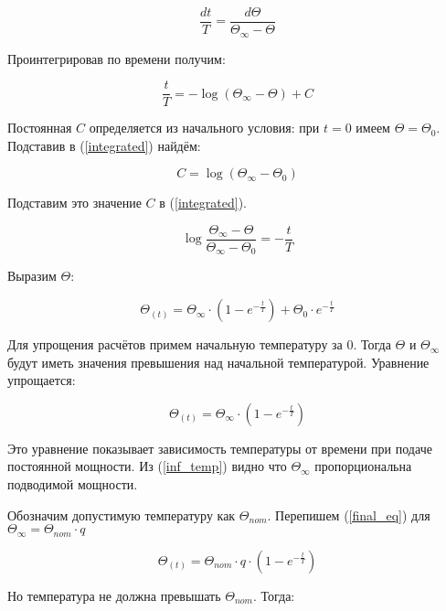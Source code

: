 \documentclass[a4paper]{article}
\begin{document}
\begin{equation}
\label{new_heating}
\frac{dt}{T}=\frac{d\Theta}{\Theta_{\infty}-\Theta}
\end{equation}

Проинтегрировав по времени получим:

\begin{equation}
\label{integrated}
\frac{t}{T}=-\log{(\Theta_{\infty}-\Theta)}+C
\end{equation}

Постоянная $C$ определяется из начального условия: при $t=0$ имеем
$\Theta=\Theta_{0}$. Подставив в (\ref{integrated}) найдём:

\begin{equation}
    C=\log{(\Theta_{\infty}-\Theta_{0})}
\end{equation}

Подставим это значение $C$ в (\ref{integrated}).

\begin{equation}
\log{\frac{\Theta_{\infty}-\Theta}{\Theta_{\infty}-\Theta_{0}}}=-\frac{t}{T}
\end{equation}

Выразим $\Theta$:

\begin{equation}
    \Theta_{(t)} = \Theta_{\infty}{\cdot}(1-e^{-\frac{t}{T}}) +
         {\Theta}_{0}{\cdot}e^{-\frac{t}{T}}
\end{equation}

Для упрощения расчётов примем начальную температуру за $0$. Тогда $\Theta$
и $\Theta_\infty$ будут иметь значения превышения над начальной температурой.
Уравнение упрощается:

\begin{equation}
\label{final_eq}
\Theta_{(t)} = \Theta_{\infty}{\cdot}(1-e^{-\frac{t}{T}})
\end{equation}

Это уравнение показывает зависимость температуры от времени при подаче постоянной
мощности. Из (\ref{inf_temp}) видно что $\Theta_{\infty}$ пропорциональна подводимой
мощности.

Обозначим допустимую температуру как $\Theta_{nom}$. Перепишем (\ref{final_eq}) для
$\Theta_{\infty}=\Theta_{nom}{\cdot}q$

\begin{equation}
\label{overpowered_eq}
\Theta_{(t)} = \Theta_{nom}{\cdot}q{\cdot}(1-e^{-\frac{t}{T}})
\end{equation}

Но температура не должна превышать $\Theta_{nom}$. Тогда:
\end{document}
